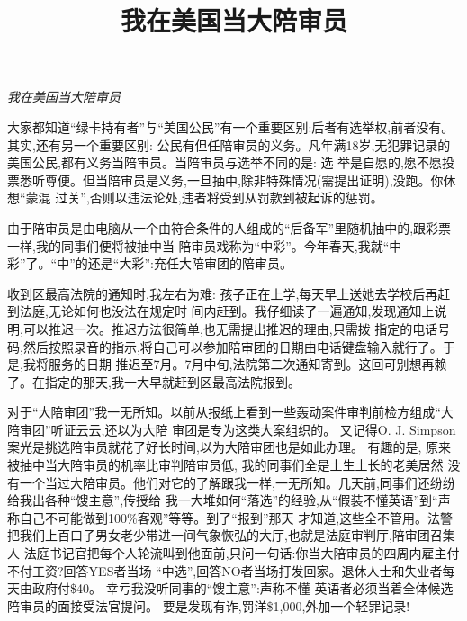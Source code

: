 ﻿\documentclass[10pt]{article}
\author{}
\date{}
\title{我在美国当大陪审员}
\begin{document}
\begin{minipage}[t]{\textwidth}
\vspace{1.5in}
\begin{center}
\textit{我在美国当大陪审员}
\end{center}
\end{minipage}

\pagebreak
\setcounter{page}{1}
{\small

大家都知道``绿卡持有者''与``美国公民''有一个重要区别:后者有选举权,前者没有。其实,还有另一个重要区别:
公民有但任陪审员的义务。凡年满18岁,无犯罪记录的美国公民,都有义务当陪审员。当陪审员与选举不同的是: 选
举是自愿的,愿不愿投票悉听尊便。但当陪审员是义务,一旦抽中,除非特殊情况(需提出证明),没跑。你休想``蒙混
过关'',否则以违法论处,违者将受到从罚款到被起诉的惩罚。

由于陪审员是由电脑从一个由符合条件的人组成的``后备军''里随机抽中的,跟彩票一样,我的同事们便将被抽中当
陪审员戏称为``中彩''。今年春天,我就``中彩''了。``中''的还是``大彩'':充任大陪审团的陪审员。


收到区最高法院的通知时,我左右为难: 孩子正在上学,每天早上送她去学校后再赶到法庭,无论如何也没法在规定时
间内赶到。我仔细读了一遍通知,发现通知上说明,可以推迟一次。推迟方法很简单,也无需提出推迟的理由,只需拨
指定的电话号码,然后按照录音的指示,将自己可以参加陪审团的日期由电话键盘输入就行了。于是,我将服务的日期
推迟至7月。7月中旬,法院第二次通知寄到。这回可别想再赖了。在指定的那天,我一大早就赶到区最高法院报到。


对于``大陪审团''我一无所知。以前从报纸上看到一些轰动案件审判前检方组成``大陪审团''听证云云,还以为大陪
审团是专为这类大案组织的。 又记得O. J. Simpson案光是挑选陪审员就花了好长时间,以为大陪审团也是如此办理。
有趣的是, 原来被抽中当大陪审员的机率比审判陪审员低, 我的同事们\myrule 全是土生土长的老美\myrule 居然
没有一个当过大陪审员。他们对它的了解跟我一样,一无所知。几天前,同事们还纷纷给我出各种``馊主意'',传授给
我一大堆如何``落选''的经验,从``假装不懂英语''到``声称自己不可能做到100\%客观''等等。到了``报到''那天
才知道,这些全不管用。法警把我们上百口子男女老少带进一间气象恢弘的大厅,也就是法庭审判厅,陪审团召集人
\myrule 法庭书记官把每个人轮流叫到他面前,只问一句话:你当大陪审员的四周内雇主付不付工资?回答YES者当场
``中选'',回答NO者当场打发回家。退休人士和失业者每天由政府付\$40。 幸亏我没听同事的``馊主意'':声称不懂
英语者必须当着全体候选陪审员的面接受法官提问。 要是发现有诈,罚洋\$1,000,外加一个轻罪记录!

}
\end{document}
